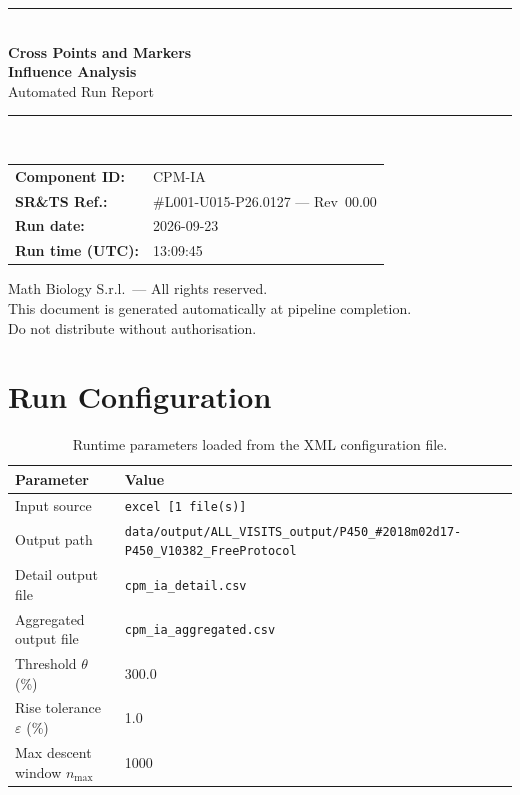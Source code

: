 \documentclass[a4paper,11pt]{article}
\begin{document}
\begin{titlepage}
\begin{center}
  \vspace*{1.8cm}
  {\color{dmaaccent}\rule{\linewidth}{1.5pt}}\\[0.6cm]
  {\LARGE\bfseries\color{dmaaccent}
    Cross Points and Markers\\[0.25cm]
    Influence Analysis}\\[0.4cm]
  {\Large Automated Run Report}\\[0.3cm]
  {\color{dmaaccent}\rule{\linewidth}{1.5pt}}\\[2cm]

  \begin{tabular}{ll}
    \textbf{Component ID:}   & CPM-IA \\[0.3cm]
    \textbf{SR\&TS Ref.:}    & \#L001-U015-P26.0127 --- Rev~00.00 \\[0.3cm]
    \textbf{Run date:}       & 2026-09-23 \\[0.3cm]
    \textbf{Run time (UTC):} & 13:09:45 \\
  \end{tabular}

  \vfill
  {\color{dmagray}\small
    Math Biology S.r.l.\ --- All rights reserved.\\
    This document is generated automatically at pipeline completion.\\
    Do not distribute without authorisation.}
\end{center}
\end{titlepage}

\tableofcontents
\clearpage

\section{Run Configuration}

\begin{table}[h!]
\centering
\small
\caption{Runtime parameters loaded from the XML configuration file.}
\begin{tabular}{ll}
\toprule
\textbf{Parameter} & \textbf{Value} \\
\midrule
Input source                      & \texttt{excel [1 file(s)]} \\
Output path                       & \texttt{data/output/ALL\_VISITS\_output/P450\_\#2018m02d17-P450\_V10382\_FreeProtocol} \\
Detail output file                & \texttt{cpm\_ia\_detail.csv} \\
Aggregated output file            & \texttt{cpm\_ia\_aggregated.csv} \\
Threshold $\theta$ (\%)           & 300.0 \\
Rise tolerance $\varepsilon$ (\%) & 1.0 \\
Max descent window $n_{\max}$     & 1000 \\
\bottomrule
\end{tabular}
\end{table}
\end{document}
